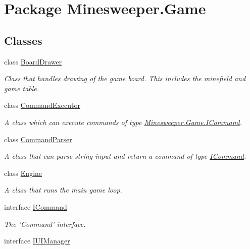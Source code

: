 \hypertarget{namespace_minesweeper_1_1_game}{\section{Package Minesweeper.\+Game}
\label{namespace_minesweeper_1_1_game}
}
\subsection*{Classes}
\begin{DoxyCompactItemize}
\item 
class \hyperlink{class_minesweeper_1_1_game_1_1_board_drawer}{Board\+Drawer}
\begin{DoxyCompactList}\small\item\em Class that handles drawing of the game board. This includes the minefield and game table. \end{DoxyCompactList}\item 
class \hyperlink{class_minesweeper_1_1_game_1_1_command_executor}{Command\+Executor}
\begin{DoxyCompactList}\small\item\em A class which can execute commands of type \hyperlink{interface_minesweeper_1_1_game_1_1_i_command}{Minesweeper.\+Game.\+I\+Command}. \end{DoxyCompactList}\item 
class \hyperlink{class_minesweeper_1_1_game_1_1_command_parser}{Command\+Parser}
\begin{DoxyCompactList}\small\item\em A class that can parse string input and return a command of type \hyperlink{interface_minesweeper_1_1_game_1_1_i_command}{I\+Command}. \end{DoxyCompactList}\item 
class \hyperlink{class_minesweeper_1_1_game_1_1_engine}{Engine}
\begin{DoxyCompactList}\small\item\em A class that runs the main game loop. \end{DoxyCompactList}\item 
interface \hyperlink{interface_minesweeper_1_1_game_1_1_i_command}{I\+Command}
\begin{DoxyCompactList}\small\item\em The 'Command' interface. \end{DoxyCompactList}\item 
interface \hyperlink{interface_minesweeper_1_1_game_1_1_i_u_i_manager}{I\+U\+I\+Manager}

\end{DoxyCompactItemize}
